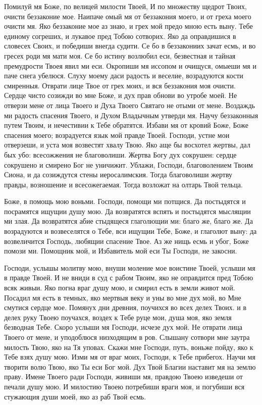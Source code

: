 \begin{mymulticols}
Помилуй мя Боже, по велицей милости Твоей, И по множеству щедрот Твоих, очисти беззаконие мое. Наипаче омый мя от беззакония моего, и от греха моего очисти мя. Яко беззаконие мое аз знаю, и грех мой предо мною есть выну. Тебе единому согреших, и лукавое пред Тобою сотворих. Яко да оправдишися в словесех Своих, и победиши внегда судити. Се бо в беззакониих зачат есмь, и во гресех роди мя мати моя. Се бо истину возлюбил еси, безвестная и тайная премудрости Твоея явил ми еси. Окропиши мя иссопом и очищуся, омыеши мя и паче снега убелюся. Слуху моему даси радость и веселие, возрадуются кости смиренныя. Отврати лице Твое от грех моих, и вся беззакония моя очисти. Сердце чисто созижди во мне Боже, и дух прав обнови во утробе моей. Не отверзи мене от лица Твоего и Духа Твоего Святаго не отыми от мене. Воздаждь ми радость спасения Твоего, и Духом Владычным утверди мя. Научу беззаконныя путем Твоим, и нечестивии к Тебе обратятся. Избави мя от кровий Боже, Боже спасения моего; возрадуется язык мой правде Твоей. Господи, устне мои отверзеши, и уста моя возвестят хвалу Твою. Яко аще бы восхотел жертвы, дал бых убо: всесожжения не благоволиши. Жертва Богу дух сокрушен: сердце сокрушено и смирено Бог не уничижит. Ублажи, Господи, благоволением Твоим Сиона, и да созиждутся стены иеросалимския. Тогда благоволиши жертву правды, возношение и всесожегаемая. Тогда возложат на олтарь Твой тельца.




Боже, в помощь мою воньми. Господи, помощи ми потщися. Да постыдятся и посрамятся ищущии душу мою. Да возвратятся вспять и постыдятся мыслящии ми злая. Да возвратятся абие стыдящеся глаголющии ми: благо же, благо же. Да возрадуются и возвеселятся о Тебе, вси ищущии Тебе, Боже, и глаголют выну: да возвеличится Господь, любящии спасение Твое. Аз же нищь есмь и убог, Боже помози ми. Помощник мой, и Избавитель мой еси Ты Господи, не закосни.




Господи, услышы молитву мою, внуши моление мое воистине Твоей, услыши мя в правде Твоей. И не вниди в суд с рабом Твоим, яко не оправдится пред Тобою всяк живыи. Яко погна враг душу мою, и смирил есть в земли живот мой. Посадил мя есть в темных, яко мертвыя веку и уны во мне дух мой, во Мне смутися сердце мое. Помянух дни древния, поучихся во всех делех Твоих. и в делех руку Твоею поучахся, воздех к Тебе руце мои, душа моя, яко земля безводная Тебе. Скоро услыши мя Господи, исчезе дух мой. Не отврати лица Твоего от мене, и уподоблюся низходящим в ров. Слышану сотвори мне заутра милость Твою, яко на Тя уповах. Скажи мне Господи, путь, воньже пойду, яко к Тебе взях душу мою. Изми мя от враг моих, Господи, к Тебе прибегох. Научи мя творити волю Твою, яко Ты еси Бог мой. Дух Твой Благии наставит мя на землю праву. Имене Твоего ради Господи, живиши мя, правдою Твоею изведеши от печали душу мою. И милостию Твоею потребиши враги моя, и погубиши вся стужающия души моей, яко аз раб Твой есмь.



\end{mymulticols}
